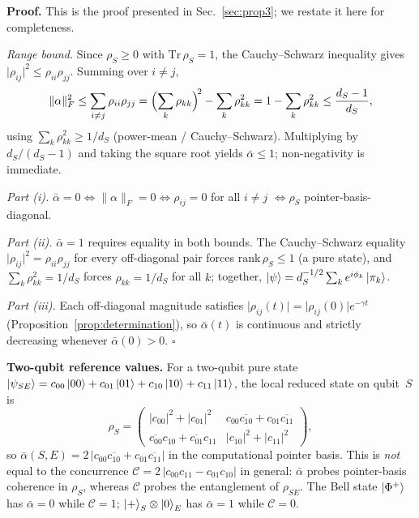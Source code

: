 \textbf{Proof.}
This is the proof presented in
Sec.~\ref{sec:prop3}; we restate it here for completeness.

\textit{Range bound.}
Since $\rho_S\geq 0$ with $\mathrm{Tr}\,\rho_S = 1$, the
Cauchy--Schwarz inequality gives
$\lvert\rho_{ij}\rvert^2 \leq \rho_{ii}\rho_{jj}$.
Summing over $i\neq j$,
\begin{equation*}
  \lVert\alpha\rVert_F^2
    \leq \sum_{i\neq j}\rho_{ii}\rho_{jj}
    = \Bigl(\sum_k\rho_{kk}\Bigr)^{\!2} - \sum_k\rho_{kk}^2
    = 1 - \sum_k\rho_{kk}^2
    \leq \frac{d_S - 1}{d_S},
\end{equation*}
using $\sum_k\rho_{kk}^2 \geq 1/d_S$ (power-mean / Cauchy--Schwarz).
Multiplying by $d_S/(d_S-1)$ and taking the square root yields
$\bar\alpha\leq 1$; non-negativity is immediate.

\textit{Part (i).}
$\bar\alpha = 0\Leftrightarrow\lVert\alpha\rVert_F = 0
 \Leftrightarrow \rho_{ij}=0$ for all $i\neq j$
 $\Leftrightarrow\rho_S$ pointer-basis-diagonal.

\textit{Part (ii).}
$\bar\alpha = 1$ requires equality in both bounds.
The Cauchy--Schwarz equality
$\lvert\rho_{ij}\rvert^2 = \rho_{ii}\rho_{jj}$ for every off-diagonal
pair forces $\mathrm{rank}\,\rho_S \leq 1$ (a pure state), and
$\sum_k\rho_{kk}^2 = 1/d_S$ forces $\rho_{kk} = 1/d_S$ for all $k$;
together,
$\ket{\psi} = d_S^{-1/2}\sum_k e^{i\phi_k}\ket{\pi_k}$.

\textit{Part (iii).}
Each off-diagonal magnitude satisfies
$\lvert\rho_{ij}(t)\rvert = \lvert\rho_{ij}(0)\rvert e^{-\gamma t}$
(Proposition~\ref{prop:determination}), so $\bar\alpha(t)$ is
continuous and strictly decreasing whenever $\bar\alpha(0)>0$.
$\square$

\textbf{Two-qubit reference values.}
For a two-qubit pure state
$\ket{\psi_{SE}} = c_{00}\ket{00} + c_{01}\ket{01}
                  + c_{10}\ket{10} + c_{11}\ket{11}$,
the local reduced state on qubit~$S$ is
\begin{equation*}
  \rho_S = \begin{pmatrix}
    \lvert c_{00}\rvert^2 + \lvert c_{01}\rvert^2 &
    c_{00}\overline{c_{10}} + c_{01}\overline{c_{11}} \\[2pt]
    \overline{c_{00}}c_{10} + \overline{c_{01}}c_{11} &
    \lvert c_{10}\rvert^2 + \lvert c_{11}\rvert^2
  \end{pmatrix},
\end{equation*}
so $\bar\alpha(S,E) = 2\,\lvert c_{00}\overline{c_{10}}
                      + c_{01}\overline{c_{11}}\rvert$
in the computational pointer basis.
This is \emph{not} equal to the concurrence
$\mathcal{C} = 2\,\lvert c_{00}c_{11} - c_{01}c_{10}\rvert$ in general:
$\bar\alpha$ probes pointer-basis coherence in $\rho_S$, whereas
$\mathcal{C}$ probes the entanglement of $\rho_{SE}$. The Bell state
$\ket{\Phi^+}$ has $\bar\alpha = 0$ while $\mathcal{C} = 1$;
$\ket{+}_S\otimes\ket{0}_E$ has $\bar\alpha = 1$ while $\mathcal{C} = 0$.

